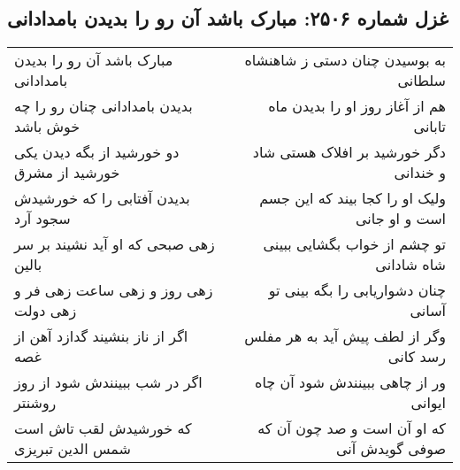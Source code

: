\begin{center}
\section*{غزل شماره ۲۵۰۶: مبارک باشد آن رو را بدیدن بامدادانی}
\label{sec:2506}
\begin{longtable}{l p{0.5cm} r}
مبارک باشد آن رو را بدیدن بامدادانی
&&
به بوسیدن چنان دستی ز شاهنشاه سلطانی
\\
بدیدن بامدادانی چنان رو را چه خوش باشد
&&
هم از آغاز روز او را بدیدن ماه تابانی
\\
دو خورشید از بگه دیدن یکی خورشید از مشرق
&&
دگر خورشید بر افلاک هستی شاد و خندانی
\\
بدیدن آفتابی را که خورشیدش سجود آرد
&&
ولیک او را کجا بیند که این جسم است و او جانی
\\
زهی صبحی که او آید نشیند بر سر بالین
&&
تو چشم از خواب بگشایی ببینی شاه شادانی
\\
زهی روز و زهی ساعت زهی فر و زهی دولت
&&
چنان دشواریابی را بگه بینی تو آسانی
\\
اگر از ناز بنشیند گدازد آهن از غصه
&&
وگر از لطف پیش آید به هر مفلس رسد کانی
\\
اگر در شب ببینندش شود از روز روشنتر
&&
ور از چاهی ببینندش شود آن چاه ایوانی
\\
که خورشیدش لقب تاش است شمس الدین تبریزی
&&
که او آن است و صد چون آن که صوفی گویدش آنی
\\
\end{longtable}
\end{center}
